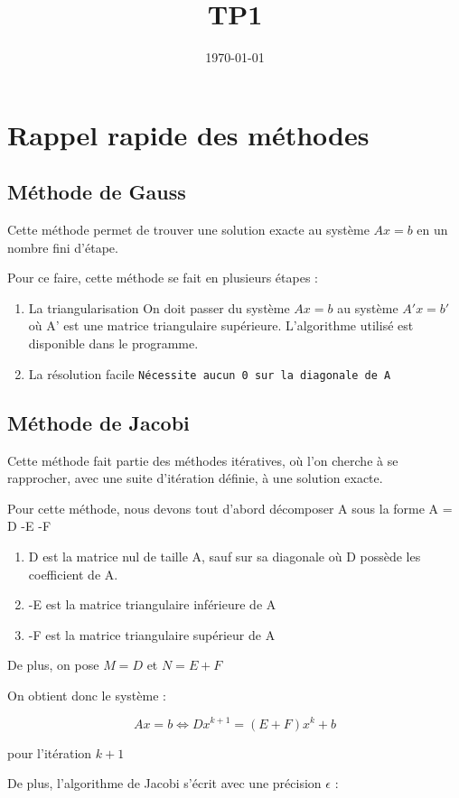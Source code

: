 \documentclass[11pt]{article}
\date{\today}
\title{TP1}
\begin{document}
\maketitle
\tableofcontents

\section{Rappel rapide des méthodes}
\label{sec:orga81117c}
\subsection{Méthode de Gauss}
\label{sec:orgb6fa052}
Cette méthode permet de trouver une solution exacte au système \(Ax = b\) en un nombre fini d'étape.


Pour ce faire, cette méthode se fait en plusieurs étapes :

\begin{enumerate}
\item La triangularisation
On doit passer du système \(Ax=b\) au système \(A'x=b'\) où A' est une matrice triangulaire supérieure. L'algorithme utilisé est disponible dans le programme.
\item La résolution facile
\texttt{Nécessite aucun 0 sur la diagonale de A}
\end{enumerate}

\subsection{Méthode de Jacobi}
\label{sec:orgef40923}

Cette méthode fait partie des méthodes itératives, où l'on cherche à se rapprocher, avec une suite d'itération définie, à une solution exacte.

Pour cette méthode, nous devons tout d'abord décomposer A sous la forme A = D -E -F

\begin{enumerate}
\item D est la matrice nul de taille A, sauf sur sa diagonale où D possède les coefficient de A.
\item -E est la matrice triangulaire inférieure de A
\item -F est la matrice triangulaire supérieur de A
\end{enumerate}



De plus, on pose \(M = D\) et \(N = E + F\)

On obtient donc le système : 

\[Ax = b \Longleftrightarrow Dx^{k+1} = (E + F)x^k + b \]

pour l'itération \(k+1\)

De plus, l'algorithme de Jacobi s'écrit avec une précision \(\epsilon\) : 
\end{document}
